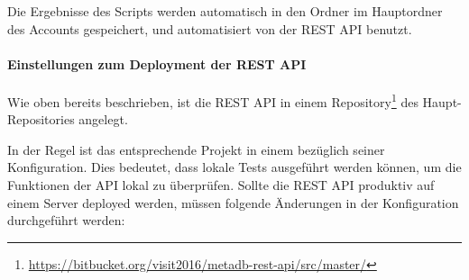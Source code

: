 Die Ergebnisse des Scripts werden automatisch in den Ordner \texttt{} im Hauptordner des Accounts \texttt{} gespeichert, und automatisiert von der REST API benutzt.

\paragraph{Einstellungen zum Deployment der REST API}

Wie oben bereits beschrieben, ist die REST API in einem Repository\footnote{\url{https://bitbucket.org/visit2016/metadb-rest-api/src/master/}} des \visit Haupt-Repositories angelegt.

In der Regel ist das entsprechende Projekt in einem  bezüglich seiner Konfiguration. Dies bedeutet, dass lokale Tests ausgeführt werden können, um die Funktionen der API lokal zu überprüfen. Sollte die REST API produktiv auf einem Server deployed werden, müssen folgende Änderungen in der Konfiguration durchgeführt werden:

